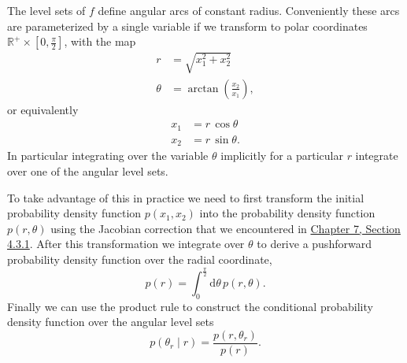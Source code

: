 \documentclass[
  letterpaper,
  DIV=11,
  numbers=noendperiod]{scrartcl}
\begin{document}
The level sets of \(f\) define angular arcs of constant radius.
Conveniently these arcs are parameterized by a single variable if we
transform to polar coordinates
\(\mathbb{R}^{+} \times \left[ 0, \frac{\pi}{2} \right]\), with the map
\begin{align*}
r &= \sqrt{ x_{1}^{2} + x_{2}^{2} }
\\
\theta &= \arctan \left( \frac{ x_{2} }{ x_{1} } \right),
\end{align*} or equivalently \begin{align*}
x_{1} &= r \, \cos \theta
\\
x_{2} &= r \, \sin \theta.
\end{align*} In particular integrating over the variable \(\theta\)
implicitly for a particular \(r\) integrate over one of the angular
level sets.

To take advantage of this in practice we need to first transform the
initial probability density function \(p(x_{1}, x_{2})\) into the
probability density function \(p(r, \theta)\) using the Jacobian
correction that we encountered in
\href{https://betanalpha.github.io/assets/chapters_html/transforming_probability_spaces.html}{Chapter
7, Section 4.3.1}. After this transformation we integrate over
\(\theta\) to derive a pushforward probability density function over the
radial coordinate, \[
p(r)
=
\int_{0}^{\frac{\pi}{2}} \mathrm{d} \theta \, p(r, \theta).
\] Finally we can use the product rule to construct the conditional
probability density function over the angular level sets \[
p(\theta_{r} \mid r) = \frac{ p(r, \theta_{r}) }{ p(r) }.
\]
\end{document}
